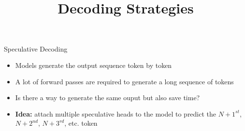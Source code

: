 



\usepackage{animate}

\newcommand{\learninggoals}{
\item Get to know speculative decoding
\item Learn about Minimum Bayes Risk (MBR) Decoding
}
\def\myblue#1{\textcolor{texblue}{#1}}

\title{Decoding Strategies}
\date{}




\begin{vbframe}{Speculative Decoding}

\vfill

\begin{itemize}
    \item Models generate the output sequence token by token
    \item A lot of forward passes are required to generate a long sequence of tokens
    \item Is there a way to generate the same ouput but also save time?
    \item \textbf{Idea:} attach multiple speculative heads to the model to predict the $N+1^{st}$, $N+2^{nd}$, $N+3^{rd}$, etc. token
\end{itemize}

\vfill
    
\end{vbframe}


